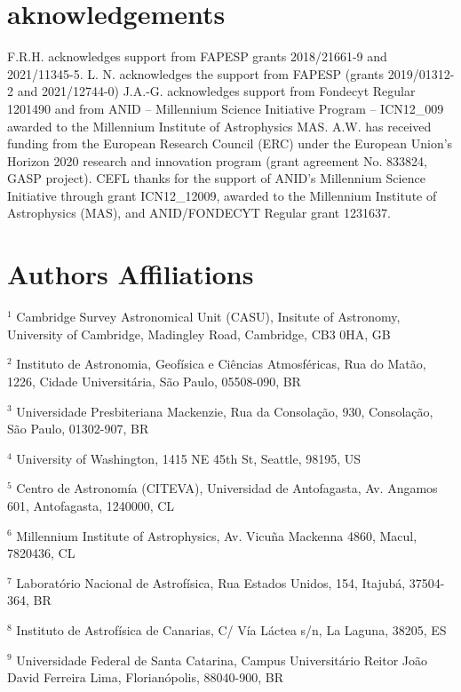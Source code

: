 \section*{aknowledgements}
F.R.H. acknowledges support from FAPESP grants 2018/21661-9 and 2021/11345-5.
L. N. acknowledges the support from FAPESP (grants 2019/01312-2 and 2021/12744-0)
J.A.-G. acknowledges support from Fondecyt Regular 1201490 and from ANID – Millennium Science Initiative Program – ICN12_009 awarded to the Millennium Institute of Astrophysics MAS.
A.W. has received funding from the European Research Council (ERC) under the European Union’s Horizon 2020 research and innovation program (grant agreement No. 833824, GASP project).
CEFL thanks for the support of ANID's Millennium Science Initiative through grant ICN12_12009, awarded to the Millennium Institute of Astrophysics (MAS), and ANID/FONDECYT Regular grant 1231637.


\section{Authors Affiliations}\label{ap:affiliations}

\noindent
$^{1}$ Cambridge Survey Astronomical Unit (CASU), Insitute of Astronomy, University of Cambridge, Madingley Road, Cambridge, CB3 0HA, GB

\noindent
$^{2}$ Instituto de Astronomia, Geofísica e Ciências Atmosféricas, Rua do Matão, 1226, Cidade Universitária, São Paulo, 05508-090, BR

\noindent
$^{3}$ Universidade Presbiteriana Mackenzie, Rua da Consolação, 930, Consolação, São Paulo, 01302-907, BR

\noindent
$^{4}$ University of Washington, 1415 NE 45th St, Seattle, 98195, US

\noindent
$^{5}$ Centro de Astronomía (CITEVA), Universidad de Antofagasta, Av. Angamos 601, Antofagasta, 1240000, CL

\noindent
$^{6}$ Millennium Institute of Astrophysics, Av. Vicuña Mackenna 4860, Macul, 7820436, CL

\noindent
$^{7}$ Laboratório Nacional de Astrofísica, Rua Estados Unidos, 154, Itajubá, 37504-364, BR

\noindent
$^{8}$ Instituto de Astrofísica de Canarias, C/ Vía Láctea s/n, La Laguna, 38205, ES

\noindent
$^{9}$ Universidade Federal de Santa Catarina, Campus Universitário Reitor João David Ferreira Lima, Florianópolis, 88040-900, BR

